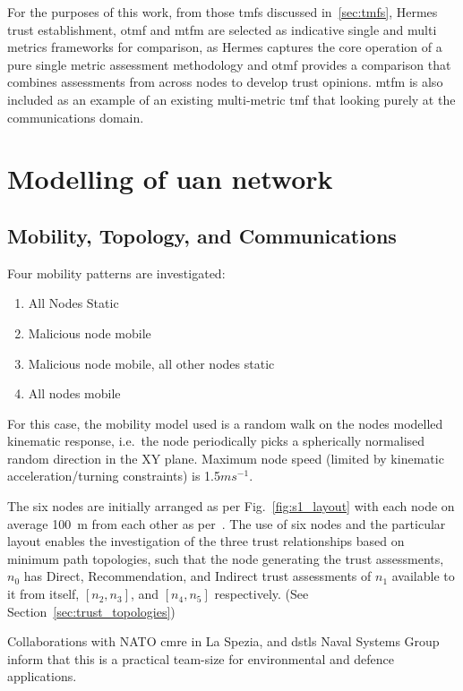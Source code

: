 For the purposes of this work, from those \glspl{tmf} discussed in~\autoref{sec:tmfs}, Hermes trust establishment, \gls{otmf} and \gls{mtfm} are selected as indicative single and multi metrics frameworks for comparison, as Hermes captures the core operation of a pure single metric assessment methodology and \gls{otmf} provides a comparison that combines assessments from across nodes to develop trust opinions.
\gls{mtfm} is also included as an example of an existing multi-metric \gls{tmf} that looking purely at the communications domain.



\section{Modelling of \gls{uan} network}\label{sec:initialsystemcharacterization}

\subsection{Mobility, Topology, and Communications}

Four mobility patterns are investigated:
\begin{enumerate}
	\item All Nodes Static
	\item Malicious node mobile
	\item Malicious node mobile, all other nodes static
	\item All nodes mobile
\end{enumerate}

For this case, the mobility model used is a random walk on the nodes modelled kinematic response, i.e.\ the node periodically picks a spherically normalised random direction in the XY plane.
Maximum node speed (limited by kinematic acceleration/turning constraints) is 1.5$ms^{-1}$.

The six nodes are initially arranged as per Fig.~\ref{fig:s1_layout} with each node on average \SI{100}{\meter} from each other as per~\cite{Guo11}.
The use of six nodes and the particular layout enables the investigation of the three trust relationships based on minimum path topologies, such that the node generating the trust assessments, $n_0$ has Direct, Recommendation, and Indirect trust assessments of $n_1$ available to it from itself, $[n_2,n_3]$, and $[n_4,n_5]$ respectively. 
(See Section~\ref{sec:trust_topologies})

Collaborations with NATO \gls{cmre} in La Spezia, and \glspl{dstl} Naval Systems Group inform that this is a practical team-size for environmental and defence applications.

